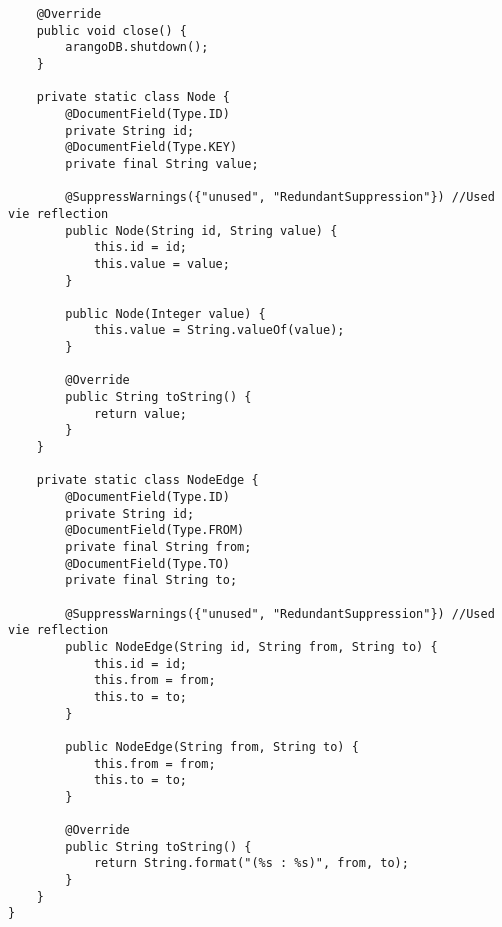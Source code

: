\begin{lstlisting}
    @Override
    public void close() {
        arangoDB.shutdown();
    }

    private static class Node {
        @DocumentField(Type.ID)
        private String id;
        @DocumentField(Type.KEY)
        private final String value;

        @SuppressWarnings({"unused", "RedundantSuppression"}) //Used vie reflection
        public Node(String id, String value) {
            this.id = id;
            this.value = value;
        }

        public Node(Integer value) {
            this.value = String.valueOf(value);
        }

        @Override
        public String toString() {
            return value;
        }
    }

    private static class NodeEdge {
        @DocumentField(Type.ID)
        private String id;
        @DocumentField(Type.FROM)
        private final String from;
        @DocumentField(Type.TO)
        private final String to;

        @SuppressWarnings({"unused", "RedundantSuppression"}) //Used vie reflection
        public NodeEdge(String id, String from, String to) {
            this.id = id;
            this.from = from;
            this.to = to;
        }

        public NodeEdge(String from, String to) {
            this.from = from;
            this.to = to;
        }

        @Override
        public String toString() {
            return String.format("(%s : %s)", from, to);
        }
    }
}
\end{lstlisting}